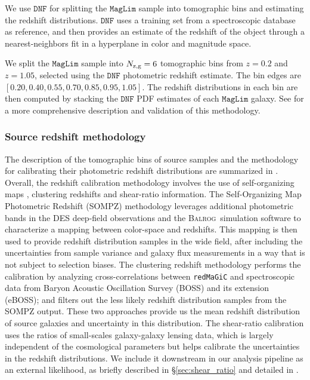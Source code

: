 \documentclass[aps, prd,twocolumn,superscriptaddress,nofootinbib,preprintnumbers]{revtex4-1}
\newcommand{\redmagic}{\texttt{redMaGiC} }
\newcommand{\maglim}{\texttt{MagLim} }
\newcommand{\balrog}{{\textsc{Balrog}}}
\begin{document}
We use $\texttt{DNF}$ \citep{De_Vicente_2016} for splitting the $\maglim$ sample into tomographic bins and estimating the redshift distributions. $\texttt{DNF}$  uses a training set from a spectroscopic database as reference, and then provides an estimate of the redshift of the object through a nearest-neighbors fit in a hyperplane in color and magnitude space.

We split the $\maglim$ sample into $N_{\rm z,g} = 6$ tomographic bins from $z=0.2$ and $z=1.05$, selected using the $\texttt{DNF}$ photometric redshift estimate. The bin edges are $[0.20, 0.40, 0.55, 0.70, 0.85, 0.95, 1.05]$. The redshift distributions in each bin are then computed by stacking the $\texttt{DNF}$ PDF estimates of each $\maglim$ galaxy. See \cite{y3-2x2ptaltlensresults} for a more comprehensive description and validation of this methodology.

\subsubsection{Source redshift methodology}
\label{sec:sourcez}
The description of the tomographic bins of source samples and the methodology for calibrating their photometric redshift distributions are summarized in \citet*{y3-sompz}. Overall, the redshift calibration methodology involves the use of self-organizing maps \citep{y3-sompz}, clustering redshifts \citep{y3-sourcewz} and shear-ratio \citep{y3-shearratio} information. The Self-Organizing Map Photometric Redshift (SOMPZ) methodology leverages additional photometric bands in the DES deep-field observations \citep{y3-deepfields} and the \balrog\ simulation software to characterize a mapping between color-space and redshifts. This mapping is then used to provide redshift distribution samples in the wide field, after including the uncertainties from sample variance and galaxy flux measurements in a way that is not subject to selection biases. The clustering redshift methodology performs the calibration by analyzing cross-correlations between \redmagic and spectroscopic data from Baryon Acoustic Oscillation Survey (BOSS) and its extension (eBOSS); and filters out the less likely redshift distribution samples from the SOMPZ output. These two approaches provide us the mean redshift distribution of source galaxies and uncertainty in this distribution. The shear-ratio calibration uses the ratios of small-scales galaxy-galaxy lensing data, which is largely independent of the cosmological parameters but helps calibrate the uncertainties in the redshift distributions. We include it downstream in our analysis pipeline as an external likelihood, as briefly described in \S\ref{sec:shear_ratio} and detailed in \citet*{y3-shearratio}. 
\end{document}
